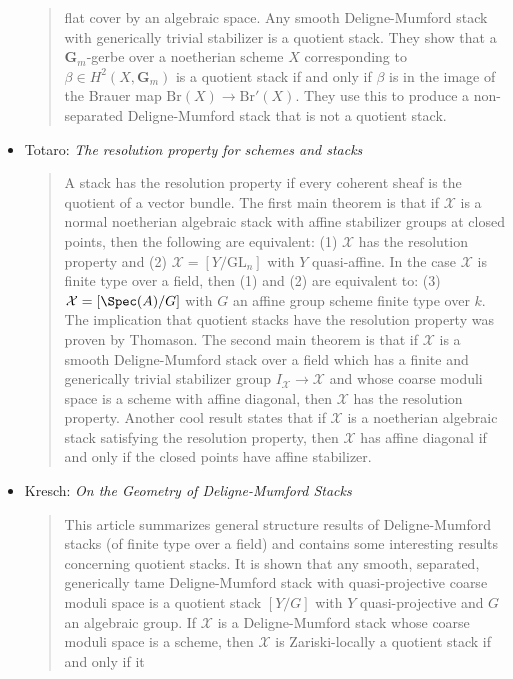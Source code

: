 \begin{itemize}
\begin{quote}
flat cover by an algebraic space. Any smooth Deligne-Mumford stack with
generically trivial stabilizer is a quotient stack.
They show that a $\mathbf{G}_m$-gerbe over a noetherian scheme $X$
corresponding to
$\beta \in H^2(X, \mathbf{G}_m)$ is a quotient stack if and only if $\beta$ is
in the
image of the Brauer map $\text{Br}(X) \to \text{Br}'(X)$. They use this to
produce a
non-separated Deligne-Mumford stack that is not a quotient stack.
\end{quote}
\item Totaro: \emph{The resolution property for schemes and stacks}
\cite{totaro_resolution}
\begin{quote}
A stack has the resolution property if every coherent sheaf is the quotient of
a vector bundle. The first main theorem is that if $\mathcal{X}$ is a normal
noetherian algebraic stack with affine stabilizer groups at closed points, then
the following are equivalent: (1) $\mathcal{X}$ has the resolution property and
(2)
$\mathcal{X} = [Y/\text{GL}_n]$ with $Y$ quasi-affine. In the case
$\mathcal{X}$ is finite type over
a field, then (1) and (2) are equivalent to: (3)
$\mathcal{X} = [\Spec(A)/G]$ with $G$
an affine group scheme finite type over $k$. The implication that quotient
stacks have the resolution property was proven by Thomason.
The second main theorem is that if $\mathcal{X}$ is a smooth Deligne-Mumford
stack over
a field which has a finite and generically trivial stabilizer group
$I_\mathcal{X}
\to \mathcal{X}$ and whose coarse moduli space is a scheme with affine
diagonal, then
$\mathcal{X}$ has the resolution property. Another cool result states that if
$\mathcal{X}$ is
a noetherian algebraic stack satisfying the resolution property, then
$\mathcal{X}$ has
affine diagonal if and only if the closed points have affine stabilizer.
\end{quote}
\item Kresch: \emph{On the Geometry of Deligne-Mumford Stacks}
\cite{kresch_geometry}
\begin{quote}
This article summarizes general structure results of Deligne-Mumford
stacks (of finite type over a field) and contains some interesting results
concerning quotient stacks. It is shown that any smooth, separated,
generically tame Deligne-Mumford stack with quasi-projective coarse moduli
space is a quotient stack $[Y/G]$ with $Y$ quasi-projective and $G$ an
algebraic group. If $\mathcal{X}$ is a Deligne-Mumford stack whose coarse
moduli space
is a scheme, then $\mathcal{X}$ is Zariski-locally a quotient stack if and only
if it

\end{quote}
\end{itemize}

